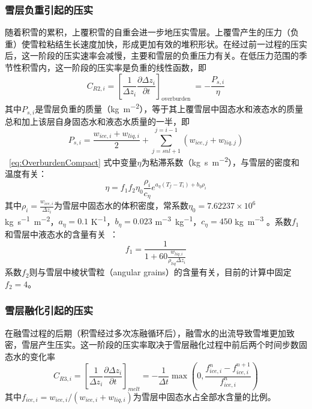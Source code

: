 \subsubsection{雪层负重引起的压实}
随着积雪的累积，上覆积雪的自重会进一步地压实雪层。上覆雪产生的压力（负重）使雪粒粘结生长速度加快，形成更加有效的堆积形状。在经过前一过程的压实后，这一阶段的压实速率会减慢，主要和雪层的负重压力有关。在低压力范围的季节性积雪内，这一阶段的压实率是负重的线性函数\citep{anderson1976point}，即
\begin{equation}\label{eq:OverburdenCompact}
C_{R2,i}=\left[\frac{1}{\Delta {z_i}} \frac{\partial \Delta {z_i}}{\partial {t}}\right]_{\text {overburden }}=-\frac{P_{s,i}}{\eta}
\end{equation}
其中$P_{s,i}$是雪层负重的质量（\unit{kg.m^{-2}}），等于其上覆雪层中固态水和液态水的质量总和加上该层自身固态水和液态水质量的一半，即
\begin{equation}
P_{s,i}=\frac{w_{ice,i}+w_{liq,i}}{2}+\sum_{{j}={snl}+1}^{{j}={i}-1}\left({w}_{ice,j}+{w}_{liq,j}\right)
\end{equation}
~\eqref{eq:OverburdenCompact} 式中变量$\eta$为粘滞系数（\unit{kg.s.m^{-2}}），与雪层的密度和温度有关：
\begin{equation}
    \eta=f_1 f_2 \eta_0 \frac{\rho_i}{c_\eta} e^{a_\eta \left(T_f-T_i\right)+b_\eta \rho_i}
\end{equation}
其中$\rho_i=\frac{w_{ice,i}}{\Delta z_i}$为雪层中固态水的体积密度，常系数$\eta_0=7.62237 \times 10^6$ \unit{kg.s^{-1}.m^{-2}}，$a_\eta=0.1$ \unit{K^{-1}}，$b_\eta=0.023$ \unit{m^{-3}.kg^{-1}}，$c_\eta=450$ \unit{kg.m^{-3}} \citep{Kampenhout2017}。系数$f_1$和雪层中液态水的含量有关~\citep{Vionnet2012}：
\begin{equation}
    f_1=\frac{1}{1+60\frac{w_{liq,i}}{\rho_{liq}\Delta z_i}}
\end{equation}
系数$f_2$则与雪层中棱状雪粒（angular grains）的含量有关，目前的计算中固定$f_2=4$。

\subsubsection{雪层融化引起的压实}
在融雪过程的后期（积雪经过多次冻融循环后），融雪水的出流导致雪堆更加致密，雪层产生压实。这一阶段的压实率取决于雪层融化过程中前后两个时间步数固态水的变化率
\begin{equation}
C_{R3,i}=\left[\frac{1}{\Delta {z_i}} \frac{\partial \Delta {z_i}}{\partial {t}}\right]_{melt}=-\frac{1}{\Delta {t}}\max\left(0,\frac{{f}_{{ice,i}}^{n}-{f}_{{ice,i}}^{n+1}}{{f}_{ice,i}^{n}}\right)
\end{equation}
其中$f_{ice,i}=w_{ice,i}/\left({w_{ice,i}+w_{liq,i}}\right)$为雪层中固态水占全部水含量的比例。


